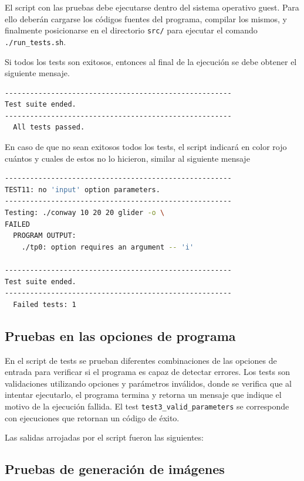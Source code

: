 \documentclass[a4paper,12pt]{article}
\numberwithin{equation}{section}
\numberwithin{figure}{section}
\begin{document}
El script con las pruebas debe ejecutarse dentro del sistema operativo guest. Para ello deberán cargarse los códigos fuentes del programa, compilar los mismos, y finalmente posicionarse en el directorio \texttt{src/} para ejecutar el comando \texttt{./run\_tests.sh}.

Si todos los tests son exitosos, entonces al final de la ejecución se debe obtener el siguiente mensaje.
\begin{lstlisting}[language=bash, style=StyleC]
------------------------------------------------------
Test suite ended.
------------------------------------------------------
  All tests passed.
\end{lstlisting}

En caso de que no sean exitosos todos los tests, el script indicará en color rojo cuántos y cuales de estos no lo hicieron, similar al siguiente mensaje
\begin{lstlisting}[language=bash, style=StyleC]
------------------------------------------------------
TEST11: no 'input' option parameters.
------------------------------------------------------
Testing: ./conway 10 20 20 glider -o \
FAILED 
  PROGRAM OUTPUT:
	./tp0: option requires an argument -- 'i'

------------------------------------------------------
Test suite ended.
------------------------------------------------------
  Failed tests: 1
\end{lstlisting}


\subsection{Pruebas en las opciones de programa}

En el script de tests se prueban diferentes combinaciones de las opciones de entrada para verificar si el programa es capaz de detectar errores. Los tests son validaciones utilizando opciones y parámetros inválidos, donde se verifica que al intentar ejecutarlo, el programa termina y retorna un mensaje que indique el motivo de la ejecución fallida. El test \texttt{test3\_valid\_parameters} se corresponde con ejecuciones que retornan un código de éxito. 

Las salidas arrojadas por el script fueron las siguientes:



\clearpage
\subsection{Pruebas de generación de imágenes}
\end{document}
